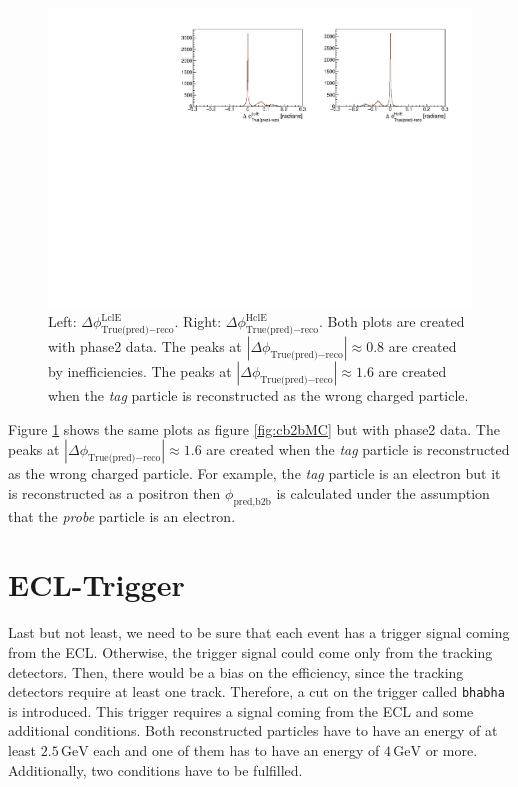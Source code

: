 \documentclass[a4paper,11pt,twosided,final,german,openbib,pdftex,listof=totoc,bibliography=totoc]{scrbook}
\begin{document}
\begin{figure}[!htbp]
	\centering
	\includegraphics[width=\textwidth]{AnhangPlots/b2b_Data.pdf}
	\caption[b2bPhi - Phi For Phase2 Data]{Left: $\Delta \phi _{\textrm{True(pred)} - \textrm{reco}}^{\textrm{LclE}}$. Right:  $\Delta \phi _{\textrm{True(pred)} - \textrm{reco}}^{\textrm{HclE}}$. Both plots are created with phase2 data. The peaks at $|\Delta \phi _{\textrm{True(pred)} - \textrm{reco}}| \approx 0.8$ are created by inefficiencies.
	The peaks at $|\Delta \phi _{\textrm{True(pred)} - \textrm{reco}}| \approx 1.6$ are created when the \textit{tag} particle is reconstructed as the wrong charged particle.
}
	\label{fig:cb2bData}
\end{figure}

Figure \ref{fig:cb2bData} shows the same plots as figure \ref{fig:cb2bMC} but with phase2 data. The peaks at $|\Delta \phi _{\textrm{True(pred)} - \textrm{reco}}| \approx 1.6$ are created when the \textit{tag} particle is reconstructed as the wrong charged particle. For example, the \textit{tag} particle is an electron but it is reconstructed as a positron then  $\phi_{\textrm{pred,b2b}}$ is calculated under the assumption that the \textit{probe} particle is an electron.




\section{ECL-Trigger}
\label{sec:ECLTrigger}

Last but not least, we need to be sure that each event has a trigger signal coming from the ECL. Otherwise, the trigger signal could come only from the tracking detectors. Then, there would be a bias on the efficiency, since the tracking detectors require at least one track. Therefore, a cut on the trigger called \texttt{bhabha} is introduced. This trigger requires a signal coming from the ECL and some additional conditions. Both reconstructed particles have to have an energy of at least $2.5\,\textrm{GeV}$ each and one of them has to have an energy of $4\,\textrm{GeV}$ or more. Additionally, two conditions have to be fulfilled. 
\end{document}
